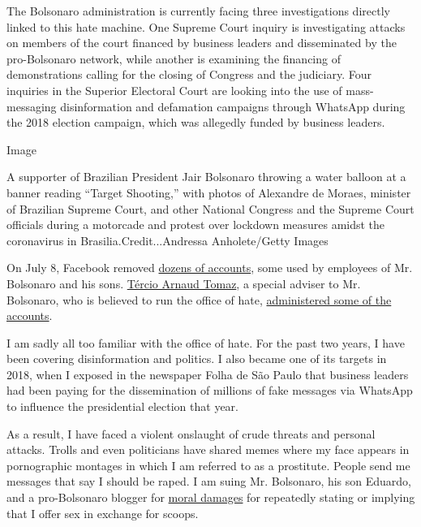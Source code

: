 The Bolsonaro administration is currently facing three investigations
directly linked to this hate machine. One Supreme Court inquiry is
investigating attacks on members of the court financed by business
leaders and disseminated by the pro-Bolsonaro network, while another is
examining the financing of demonstrations calling for the closing of
Congress and the judiciary. Four inquiries in the Superior Electoral
Court are looking into the use of mass-messaging disinformation and
defamation campaigns through WhatsApp during the 2018 election campaign,
which was allegedly funded by business leaders.

Image

A supporter of Brazilian President Jair Bolsonaro throwing a water
balloon at a banner reading ``Target Shooting,'' with photos of
Alexandre de Moraes, minister of Brazilian Supreme Court, and other
National Congress and the Supreme Court officials during a motorcade and
protest over lockdown measures amidst the coronavirus in
Brasilia.Credit...Andressa Anholete/Getty Images

On July 8, Facebook removed
\href{https://www1.folha.uol.com.br/poder/2020/07/facebook-remove-contas-falsas-ligadas-aos-bolsonaros-e-ao-gabinete-da-presidencia.shtml}{dozens
of accounts}, some used by employees of Mr. Bolsonaro and his sons.
\href{https://elpais.com/internacional/2020-07-10/facebook-rompe-la-oficina-del-odio-una-red-de-88-cuentas-de-apoyo-a-jair-bolsonaro.html}{Tércio
Arnaud Tomaz}, a special adviser to Mr. Bolsonaro, who is believed to
run the office of hate,
\href{https://apnews.com/0c58cccec2004bf250c8dab38172cbc9}{administered
some of the accounts}.

I am sadly all too familiar with the office of hate. For the past two
years, I have been covering disinformation and politics. I also became
one of its targets in 2018, when I exposed in the newspaper Folha de São
Paulo that business leaders had been paying for the dissemination of
millions of fake messages via WhatsApp to influence the presidential
election that year.

As a result, I have faced a violent onslaught of crude threats and
personal attacks. Trolls and even politicians have shared memes where my
face appears in pornographic montages in which I am referred to as a
prostitute. People send me messages that say I should be raped. I am
suing Mr. Bolsonaro, his son Eduardo, and a pro-Bolsonaro blogger for
\href{http://www.fundamedios.us/incidentes/patriciacampos-demanda-jairbolsonaro-ofensas-periodista/}{moral
damages} for repeatedly stating or implying that I offer sex in exchange
for scoops.

